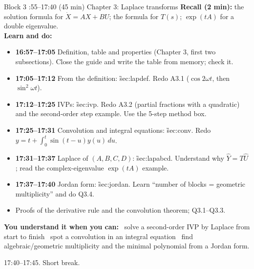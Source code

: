 \begin{sessionbox}{Block 3 :55--17:40 (45 min) \quad Chapter 3: Laplace transforms}
\textbf{Recall (2 min):} the solution formula for $\dot X=AX+BU$; the formula for $T(s)$; $\exp(tA)$ for a double eigenvalue.\\
\textbf{Learn and do:}
\begin{itemize}
\item[\core] \textbf{16:57--17:05} Definition, table and properties (Chapter 3, first two subsections). Close the guide and write the table from memory; check it.
\item[\core] \textbf{17:05--17:12} From the definition: \G{sec:lapdef}. Redo A3.1 ($\cos2\omega t$, then $\sin^2\omega t$).
\item[\core] \textbf{17:12--17:25} IVPs: \G{sec:ivp}. Redo A3.2 (partial fractions with a quadratic) and the second-order step example. Use the 5-step method box.
\item[\core] \textbf{17:25--17:31} Convolution and integral equations: \G{sec:conv}. Redo $y=t+\int_0^t\sin(t-u)y(u)\,du$.
\item[\core] \textbf{17:31--17:37} Laplace of $(A,B,C,D)$: \G{sec:lapabcd}. Understand why $\hat Y=T\hat U$; read the complex-eigenvalue $\exp(tA)$ example.
\item[\core] \textbf{17:37--17:40} Jordan form: \G{sec:jordan}. Learn ``number of blocks = geometric multiplicity'' and do Q3.4.
\item[\extra] Proofs of the derivative rule and the convolution theorem; Q3.1--Q3.3.
\end{itemize}
\textbf{You understand it when you can:}
\tick\ solve a second-order IVP by Laplace from start to finish \quad
\tick\ spot a convolution in an integral equation \quad
\tick\ find algebraic/geometric multiplicity and the minimal polynomial from a Jordan form.
\end{sessionbox}

\begin{breakbox}17:40--17:45. Short break.\end{breakbox}

